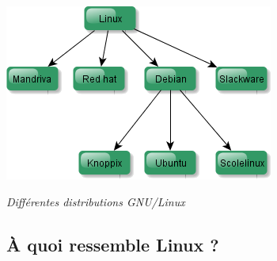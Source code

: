\documentclass[10pt,fleqn]{article} %
\begin{document}
\begin{rem}
%
%
%
%
%


\begin{center}
\includegraphics[width=.6\textwidth]{images/distrib.png}

\textit{Différentes distributions GNU/Linux}

\end{center}

\end{rem}




\subsection{À quoi ressemble Linux ?}


\end{document}

